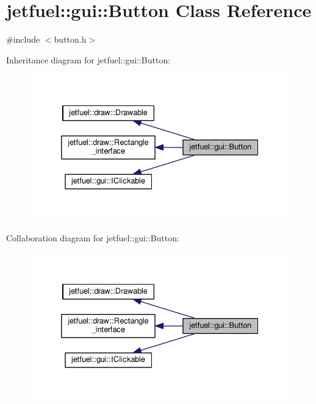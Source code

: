 \hypertarget{classjetfuel_1_1gui_1_1Button}{}\section{jetfuel\+:\+:gui\+:\+:Button Class Reference}
\label{classjetfuel_1_1gui_1_1Button}


{\ttfamily \#include $<$button.\+h$>$}



Inheritance diagram for jetfuel\+:\+:gui\+:\+:Button\+:\nopagebreak
\begin{figure}[H]
\begin{center}
\leavevmode
\includegraphics[width=332pt]{classjetfuel_1_1gui_1_1Button__inherit__graph}
\end{center}
\end{figure}


Collaboration diagram for jetfuel\+:\+:gui\+:\+:Button\+:\nopagebreak
\begin{figure}[H]
\begin{center}
\leavevmode
\includegraphics[width=332pt]{classjetfuel_1_1gui_1_1Button__coll__graph}
\end{center}
\end{figure}
